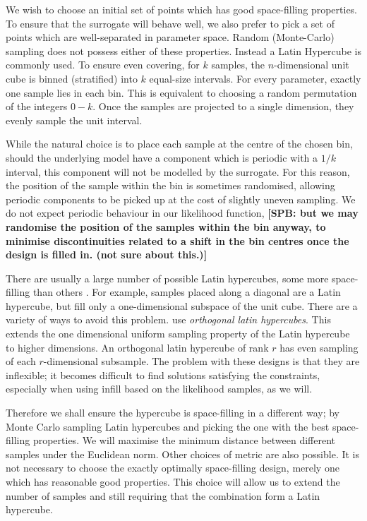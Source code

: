 \documentclass[10pt, aps, prd]{revtex4-1}
\newcommand{\spb}[1]{{\textbf{[SPB: #1]}}}
\begin{document}
We wish to choose an initial set of points which has good space-filling properties. To ensure that the surrogate will behave well, 
we also prefer to pick a set of points which are well-separated in parameter space. Random (Monte-Carlo) sampling does not 
possess either of these properties. Instead a Latin Hypercube is commonly used. To ensure even covering, for $k$ samples, 
the $n$-dimensional unit cube is binned (stratified) into $k$ equal-size intervals. For every parameter, exactly one sample 
lies in each bin. This is equivalent to choosing a random permutation of the integers $0-k$. Once the samples are projected to 
a single dimension, they evenly sample the unit interval.

While the natural choice is to place each sample at the centre of the chosen bin, should the underlying model have a component 
which is periodic with a $1/k$ interval, this component will not be modelled by the surrogate. For this reason, the position 
of the sample within the bin is sometimes randomised, allowing periodic components to be picked up at the cost of slightly 
uneven sampling. We do not expect periodic behaviour in our likelihood function, \spb{but we may randomise the position of the 
samples within the bin anyway, to minimise discontinuities related to a shift in the bin centres once the design is filled in. (not sure about this.)}

There are usually a large number of possible Latin hypercubes, some more space-filling than others \cite{someone}. For example, 
samples placed along a diagonal are a Latin hypercube, but fill only a one-dimensional subspace of the unit cube. There are a 
variety of ways to avoid this problem. \cite{Heitmann:2009} use \textit{orthogonal latin hypercubes}. This extends the 
one dimensional uniform sampling property of the Latin hypercube to higher dimensions. An orthogonal latin hypercube of rank $r$
has even sampling of each $r$-dimensional subsample. The problem with these designs is that they are inflexible; it becomes difficult
to find solutions satisfying the constraints, especially when using infill based on the likelihood samples, as we will.

Therefore we shall ensure the hypercube is space-filling in a different way; by Monte Carlo sampling Latin hypercubes and 
picking the one with the best space-filling properties. We will maximise the minimum distance between different samples \cite{someone} 
under the Euclidean norm. Other choices of metric are also possible. It is not necessary to choose the exactly optimally space-filling 
design, merely one which has reasonable good properties. This choice will allow us to extend the number of samples 
and still requiring that the combination form a Latin hypercube.
\end{document}
